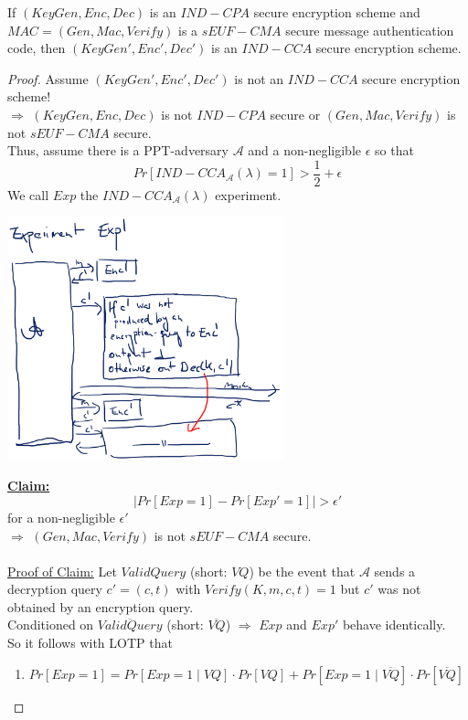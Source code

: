 	\begin{theorem}\label{thm6.5}
		If $(KeyGen,Enc,Dec)$ is an $IND-CPA$ secure encryption scheme and $MAC = (Gen,Mac,Verify)$ is a $sEUF-CMA$ secure message authentication code, 
		then $(KeyGen',Enc',Dec')$ is an $IND-CCA$ secure encryption scheme.
	\end{theorem}
	\begin{proof}
		Assume $(KeyGen',Enc',Dec')$ is not an $IND-CCA$ secure encryption scheme!\\
		$\Rightarrow$ $(KeyGen,Enc,Dec)$ is not $IND-CPA$ secure or $(Gen,Mac,Verify)$ is not $sEUF-CMA$ secure.\\
		Thus, assume there is a PPT-adversary $\mathcal{A}$ and a non-negligible $\epsilon$ so that
		$$Pr[IND-CCA_{\mathcal{A}}(\lambda) = 1] > \frac{1}{2} + \epsilon$$
		We call $Exp$ the $IND-CCA_{\mathcal{A}}(\lambda)$ experiment.
		\begin{center}
			\includegraphics[width=80mm]{Graphics/Chosen Ciphertext Security/ccs3.png}
		\end{center}
		\underline{\textbf{Claim:}}
		$$|Pr[Exp=1]-Pr[Exp'=1]| > \epsilon'$$
		for a non-negligible $\epsilon'$\\
		$\Rightarrow$ $(Gen,Mac,Verify)$ is not $sEUF-CMA$ secure.\\\\
		\underline{Proof of Claim:}
		Let $ValidQuery$ (short: $VQ$) be the event that $\mathcal{A}$ sends a decryption query $c' = (c,t)$ with
		$Verify(K,m,c,t) = 1$ but $c'$ was not obtained by an encryption query.\\
		Conditioned on $\overline{ValidQuery}$ (short: $\overline{VQ}$) $\Rightarrow$ $Exp$ and $Exp'$ behave identically.\\
		So it follows with LOTP that
		\begin{enumerate}
			\item $Pr[Exp=1] = Pr[Exp=1 \mid VQ] \cdot Pr[VQ] + Pr[Exp=1 \mid \overline{VQ}] \cdot Pr[\overline{VQ}]$

\end{enumerate}
\end{proof}

